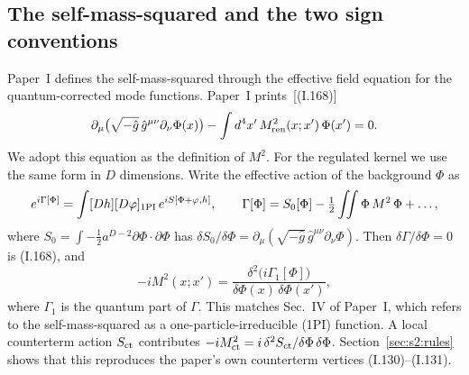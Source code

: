 \documentclass[aps,prd,onecolumn,10pt,nofootinbib,floatfix]{revtex4-2}
\newcommand{\PI}{Paper~I}
\newcommand{\eqI}[1]{(I.#1)}
\begin{document}
\subsection{The self-mass-squared and the two sign conventions}
\label{sec:s2:definition}

\PI{} defines the self-mass-squared through the effective field equation
for the quantum-corrected mode functions. \PI{} prints~[\eqI{168}]
\begin{equation*}
\partial_\mu\big(\sqrt{-\hat g}\,\hat g^{\mu\nu}\partial_\nu\Phi(x)\big)-\int d^4x'\,M^2_{\rm ren}(x;x')\,\Phi(x')=0 .
\end{equation*}
We adopt this equation as the definition of $M^2$. For the regulated
kernel we use the same form in $D$ dimensions. Write the effective action
of the background $\Phi$ as
\begin{equation}
e^{i\Gamma[\Phi]}=\int[Dh][D\varphi]_{\rm 1PI}\,e^{iS[\Phi+\varphi,h]},\qquad
\Gamma[\Phi]=S_0[\Phi]-\tfrac12\iint\Phi\,M^2\,\Phi+\dots,
\label{eq:s2:Gamma}
\end{equation}
where $S_0=\int-\tfrac12a^{D-2}\partial\Phi\cdot\partial\Phi$ has
$\delta S_0/\delta\Phi=\partial_\mu(\sqrt{-\hat g}\,\hat g^{\mu\nu}\partial_\nu\Phi)$.
Then $\delta\Gamma/\delta\Phi=0$ is \eqI{168}, and
\begin{equation}
-iM^2(x;x')=\frac{\delta^2\big(i\Gamma_1[\Phi]\big)}{\delta\Phi(x)\,\delta\Phi(x')},
\label{eq:s2:defM}
\end{equation}
where $\Gamma_1$ is the quantum part of $\Gamma$. This matches Sec.~IV of
\PI, which refers to the self-mass-squared as a one-particle-irreducible
(1PI) function. A local counterterm action $S_{\rm ct}$
contributes $-iM^2_{\rm ct}=i\,\delta^2S_{\rm ct}/\delta\Phi\,\delta\Phi$.
Section~\ref{sec:s2:rules} shows that this reproduces the paper's own
counterterm vertices \eqI{130}--\eqI{131}.
\end{document}

